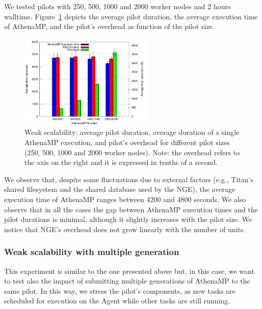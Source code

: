 We tested %
pilots %
with 250, 500, 1000 and 2000 worker nodes and
2 hours walltime. Figure~\ref{fig:weakScal1a} depicts the average pilot
duration, the average execution time of AthenaMP, and the pilot's overhead as
function of the pilot size.

\begin{figure}[!htb]
        \includegraphics[height=4.5cm,width=\columnwidth]{./figures/NGE/weak1.pdf}
    \caption{Weak scalability: average pilot duration, average duration of a
    single AthenaMP execution, and pilot's overhead for different pilot sizes
    (250, 500, 1000 and 2000 worker nodes). Note: the overhead refers to
    the axis on the right and it is expressed in tenths of a second.}
\label{fig:weakScal1a}
\end{figure}

We %
observe that, despite some fluctuations due to external factors
(e.g., Titan's shared filesystem and the shared database used by the NGE), the
average execution time of AthenaMP %
ranges between 4200 and 4800 seconds. %
We %
also observe that in all the cases the gap between AthenaMP execution times and
the pilot durations is minimal, although it slightly increases with the pilot
size. %
We %
notice that NGE's overhead does not grow linearly with the number of units.



\subsubsection{Weak scalability with multiple generation }

This experiment is similar to the one presented above but, in this case, we want
to test also the impact of submitting multiple generations of %
AthenaMP to the same pilot.
In this way, we stress the pilot's components, %
as new tasks are scheduled for execution on the Agent while other tasks are still running.

